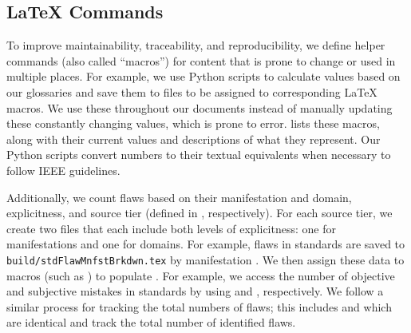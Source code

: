 \subsection[LaTeX Commands]{\LaTeX{} Commands}\label{macros}
To improve maintainability, traceability, and reproducibility, we define
helper commands (also called ``macros'') for content that is prone to change
or used in multiple places. For example, we use Python scripts to calculate
values based on our glossaries and save them to files to be assigned to
corresponding \LaTeX{} macros. We use these throughout our documents instead of
manually updating these constantly changing values, which is prone to error.
 lists these macros, along with their current values and
descriptions of what they represent. Our Python scripts convert numbers to
their textual equivalents when necessary to follow IEEE guidelines.



\label{flawCounts}
Additionally, we count flaws based on their manifestation and domain,
explicitness, and source tier (defined in , respectively).
For each source tier, we create two files that each include both levels of
explicitness: one for manifestations and one for domains. For example, flaws in
standards are saved to \texttt{build/stdFlawMnfstBrkdwn.tex} by manifestation%
. We then assign these data to macros (such as ) to
populate . For example, we access the number
of objective and subjective mistakes in standards by using
 and , respectively.
We follow a similar process for tracking the total numbers of flaws; this
includes  and 
which are identical and track the total number of identified flaws.

